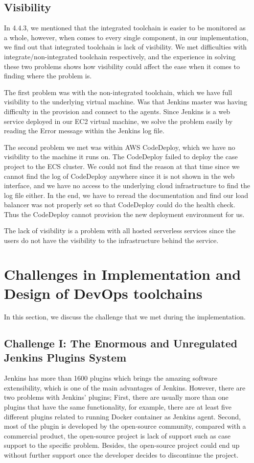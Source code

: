 \subsection{Visibility}
\label{visibility}
In 4.4.3, we mentioned that the integrated toolchain is easier to be monitored as a whole, however, when comes to every single component, in our implementation, we find out that integrated toolchain is lack of visibility. We met difficulties with integrate/non-integrated toolchain respectively, and the experience in solving these two problems shows how visibility could affect the ease when it comes to finding where the problem is.
\par
The first problem was with the non-integrated toolchain, which we have full visibility to the underlying virtual machine. Was that Jenkins master was having difficulty in the provision and connect to the agents. Since Jenkins is a web service deployed in our EC2 virtual machine, we solve the problem easily by reading the Error message within the Jenkins log file.
\par
The second problem we met was within AWS CodeDeploy, which we have no visibility to the machine it runs on. The CodeDeploy failed to deploy the case project to the ECS cluster. We could not find the reason at that time since we cannot find the log of CodeDeploy anywhere since it is not shown in the web interface, and we have no access to the underlying cloud infrastructure to find the log file either. In the end, we have to reread the documentation and find our load balancer was not properly set so that CodeDeploy could do the health check. Thus the CodeDeploy cannot provision the new deployment environment for us.
\par
The lack of visibility is a problem with all hosted serverless services since the users do not have the visibility to the infrastructure behind the service.
\section{Challenges in Implementation and Design of DevOps toolchains}
In this section, we discuss the challenge that we met during the implementation. 
\subsection{Challenge I: The Enormous and Unregulated Jenkins Plugins System}
Jenkins has more than 1600 plugins which brings the amazing software extensibility, which is one of the main advantages of Jenkins. However, there are two problems with Jenkins' plugins; First, there are usually more than one plugins that have the same functionality, for example, there are at least five different plugins related to running Docker container as Jenkins agent. Second, most of the plugin is developed by the open-source community, compared with a commercial product, the open-source project is lack of support such as case support to the specific problem. Besides, the open-source project could end up without further support once the developer decides to discontinue the project.

